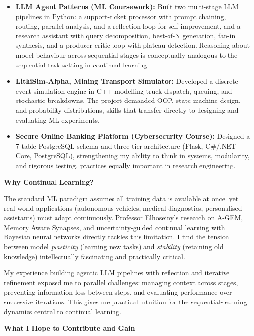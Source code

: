 \documentclass[11pt,a4paper]{article}
\begin{document}
\begin{itemize}
  \item \textbf{LLM Agent Patterns (ML Coursework):} Built two multi-stage LLM pipelines in Python: a support-ticket processor with prompt chaining, routing, parallel analysis, and a reflection loop for self-improvement, and a research assistant with query decomposition, best-of-N generation, fan-in synthesis, and a producer-critic loop with plateau detection. Reasoning about model behaviour across sequential stages is conceptually analogous to the sequential-task setting in continual learning.

  \item \textbf{LithiSim-Alpha, Mining Transport Simulator:} Developed a discrete-event simulation engine in C++ modelling truck dispatch, queuing, and stochastic breakdowns. The project demanded OOP, state-machine design, and probability distributions, skills that transfer directly to designing and evaluating ML experiments.

  \item \textbf{Secure Online Banking Platform (Cybersecurity Course):} Designed a 7-table PostgreSQL schema and three-tier architecture (Flask, C\#/.NET Core, PostgreSQL), strengthening my ability to think in systems, modularity, and rigorous testing, practices equally important in research engineering.
\end{itemize}

\textbf{\color{NavyBlue}Why Continual Learning?}

The standard ML paradigm assumes all training data is available at once, yet real-world applications (autonomous vehicles, medical diagnostics, personalised assistants) must adapt continuously. Professor Elhoseiny's research on A-GEM, Memory Aware Synapses, and uncertainty-guided continual learning with Bayesian neural networks directly tackles this limitation. I find the tension between model \emph{plasticity} (learning new tasks) and \emph{stability} (retaining old knowledge) intellectually fascinating and practically critical.

My experience building agentic LLM pipelines with reflection and iterative refinement exposed me to parallel challenges: managing context across stages, preventing information loss between steps, and evaluating performance over successive iterations. This gives me practical intuition for the sequential-learning dynamics central to continual learning.

\textbf{\color{NavyBlue}What I Hope to Contribute and Gain}
\end{document}
